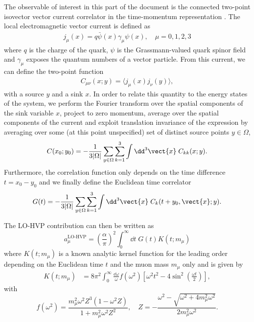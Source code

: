 The observable of interest in this part of the document is the connected two-point isovector vector current correlator in the time-momentum representation \cite{Bernecker:2011}.
The local electromagnetic vector current is defined as
\begin{align}
j_{\mu}(x) = q \bar{\psi}(x) \gamma_{\mu} \psi(x),
\quad
\mu=0,1,2,3
\end{align}
where $q$ is the charge of the quark, $\psi$ is the Grassmann-valued quark spinor field and $\gamma_{\mu}$ exposes the quantum numbers of a vector particle. From this current, we can define the two-point function
\begin{align} \label{eq:C_corr_xy}
C_{\mu \nu}(x;y) = \langle j_{\mu}(x) j_{\nu}(y) \rangle,
\end{align}
with a source $y$ and a sink $x$.
In order to relate this quantity to the energy states of the system, we perform the Fourier transform over the spatial components of the sink variable $x$, project to zero momentum, average over the spatial components of the current and exploit translation invariance of the expression by averaging over some (at this point unspecified) set of distinct source points $y \in \Omega$,
\begin{align}
C(x_0;y_0) = - \frac{1}{3 \lvert \Omega \rvert} \sum_{y \in \Omega} \sum_{k=1}^{3} \int \dd^3 \vect{x} \; C_{kk}(x; y).
\end{align}
Furthermore, the correlation function only depends on the time difference $t = x_0 - y_0$ and we finally define the Euclidean time correlator
\begin{align} \label{eq:coor1}
G(t) = - \frac{1}{3 \lvert \Omega \rvert} \sum_{y \in \Omega} \sum_{k=1}^{3} \int \dd^3 \vect{x} \; C_k(t+y_0, \vect{x}; y).
\end{align}

The LO-HVP contribution can then be written as~\cite{Bernecker:2011}
\begin{equation} \label{eq:a:mu:lohvp}
a_{\mu}^{\text{LO-HVP}} = 
\left( \frac{\alpha}{\pi} \right)^{2}
\int_{0}^{\infty} \dd t \; G(t) K(t; m_{\mu})
\end{equation}
where $K(t; m_{\mu})$ is a known analytic kernel function for the leading order depending on the Euclidean time $t$ and the muon mass $m_{\mu}$ only and is given by~\cite{Blum:2004cq}
\begin{align}
K(t; m_{\mu}) &= 
8 \pi^{2} \int_{0}^{\infty} \frac{\dd \omega}{\omega} f(\omega^{2}) \left[
\omega^{2} t^{2} - 4 \sin^{2}\left(\frac{\omega t}{2}\right)
\right],
\end{align}
with
\begin{equation}
f(\omega^{2}) = 
\frac{m_{\mu}^{2} \omega^{2} Z^{3} (1 - \omega^{2} Z)}{1 + m_{\mu}^{2} \omega^{2} Z^{2}},
\quad
Z =
- \frac{\omega^{2} - \sqrt{ \omega^{2} + 4 m_{\mu}^{2} \omega^{2} }}{ 2 m_{\mu}^{2} \omega^{2} }.
\end{equation}

